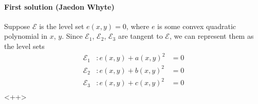 \paragraph{First solution (Jaedon Whyte)} Suppose $\mathcal E$ is the level set $e(x,y)=0$, where $e$ is some convex quadratic polynomial in $x$, $y$. Since $\mathcal E_1$, $\mathcal E_2$, $\mathcal E_3$ are tangent to $\mathcal E$, we can represent them as the level sets
\begin{align*}
    \mathcal E_1&:e(x,y)+a(x,y)^2&=0\\
    \mathcal E_2&:e(x,y)+b(x,y)^2&=0\\
    \mathcal E_3&:e(x,y)+c(x,y)^2&=0\\
\end{align*}<++>
